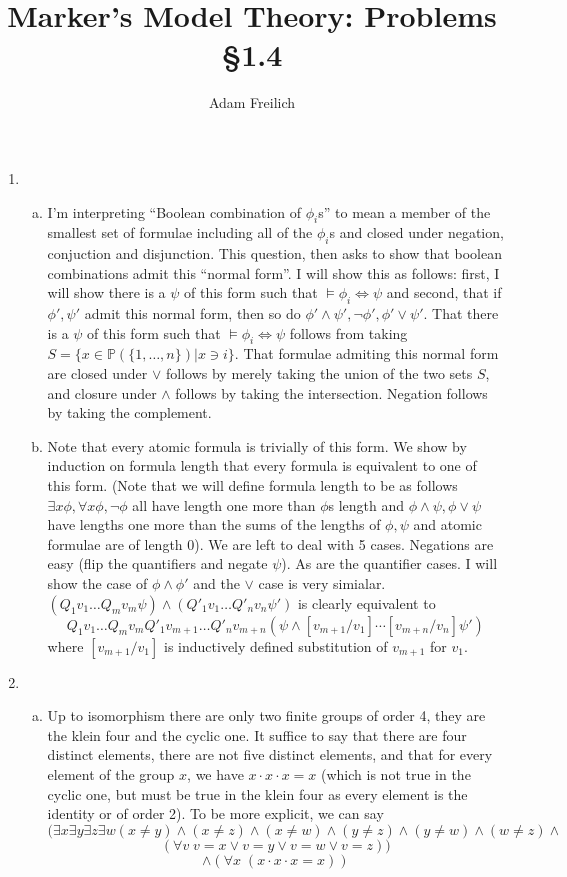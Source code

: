 \documentclass[10pt]{article}
\author{Adam Freilich}
\title{Marker's Model Theory: Problems \S 1.4}
\newcommand{\A}{\forall}
\newcommand{\E}{\exists}
\begin{document}
\maketitle

\begin{enumerate}[1.]
\item 
	\begin{enumerate}[a)] 
	\item I'm interpreting ``Boolean combination of $\phi_i$s'' to mean a member of the smallest set of formulae including all of the $\phi_i$s and closed under negation, conjuction and disjunction. This question, then asks to show that boolean combinations admit this ``normal form''. I will show this as follows: first, I will show there is a $\psi$ of this form such that $\models \phi_i \iff \psi$ and second, that if $\phi', \psi'$ admit this normal form, then so do $\phi' \land \psi', \neg \phi', \phi' \lor \psi'$. That there is a $\psi$ of this form such that $\models \phi_i \iff \psi$ follows from taking $S = \{x \in \mathbb{P}(\{1, \ldots, n\}) | x \ni i\}$. That formulae admiting this normal form are closed under $\lor$ follows by merely taking the union of the two sets $S$, and closure under $\land$ follows by taking the intersection. Negation follows by taking the complement. 
	
	\item Note that every atomic formula is trivially of this form. We show by induction on formula length that every formula is equivalent to one of this form. (Note that we will define formula length to be as follows $\E x \phi, \A x \phi, \neg \phi$ all have length one more than $\phi$s length and $\phi \land \psi, \phi \lor \psi$ have lengths one more than the sums of the lengths of $\phi, \psi$ and atomic formulae are of length 0). We are left to deal with 5 cases. Negations are easy (flip the quantifiers and negate $\psi$). As are the quantifier cases. I will show the case of $\phi \land \phi'$ and the $\lor$ case is very simialar. $(Q_1v_1\ldots Q_mv_m \psi ) \land ( Q'_1v_1\ldots Q'_nv_n \psi')$ is clearly equivalent to\[Q_1v_1\ldots Q_mv_mQ'_{1}v_{m+1}\ldots Q'_{n}v_{m+n} \left(\psi \land [v_{m+1}/v_1]\cdots[v_{m+n}/v_n]\psi'\right)\] where $[v_{m+1}/v_1]$ is inductively defined substitution of $v_{m+1}$ for $v_1$. 
	\end{enumerate}

\item  
	\begin{enumerate}[a)] 
	\item
	Up to isomorphism there are only two finite groups of order 4, they are the klein four and the cyclic one. It suffice to say that there are four distinct elements, there are not five distinct elements, and that for every element of the group $x$, we have $x \cdot x \cdot x = x$ (which is not true in the cyclic one, but must be true in the klein four as every element is the identity or of order 2). To be more explicit, we can say \[(\E x \E y \E z \E w (x \neq y) \land  (x \neq z)\land  (x \neq w)\land  (y \neq z)\land  (y \neq w) \land  (w \neq z) \land\]\[ (\A v \; v = x \lor v = y \lor v = w \lor v = z))\]\[ \land (\A x \; (x \cdot x \cdot x = x))\]
	

\end{enumerate}
\end{enumerate}
\end{document}

